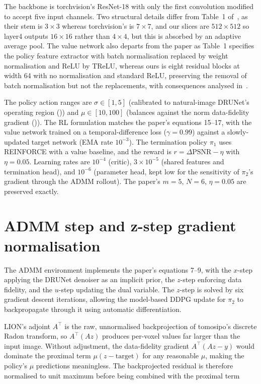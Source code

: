 The backbone is torchvision's ResNet-18 with only the first convolution modified to accept five input channels. Two structural details differ from Table~1 of~\citet{Wei2022TFPnP}, as their stem is $3\times3$ whereas torchvision's is $7\times7$, and our slices are $512\times512$ so layer4 outputs $16\times16$ rather than $4\times4$, but this is absorbed by an adaptive average pool. The value network also departs from the paper as Table~1 specifies the policy feature extractor with batch normalisation replaced by weight normalisation and ReLU by TReLU, whereas ours is eight residual blocks at width 64 with no normalisation and standard ReLU,  preserving the removal of batch normalisation but not the replacements, with consequences analysed in~.

The policy action ranges are $\sigma \in [1, 5]$ (calibrated to natural-image DRUNet's operating region ()) and $\mu \in [10, 100]$ (balances against the norm data-fidelity gradient ()). The RL formulation matches the paper's equations 15--17, with the value network trained on a temporal-difference loss ($\gamma = 0.99$) against a slowly-updated target network (EMA rate $10^{-3}$). The termination policy $\pi_1$ uses REINFORCE with a value baseline, and the reward is $r = \Delta\text{PSNR} - \eta$ with $\eta = 0.05$. Learning rates are $10^{-4}$ (critic), $3\times10^{-5}$ (shared features and termination head), and $10^{-6}$ (parameter head, kept low for the sensitivity of $\pi_2$'s gradient through the ADMM rollout). The paper's $m = 5$, $N = 6$, $\eta = 0.05$ are preserved exactly.

\section{ADMM step and z-step gradient normalisation}
\label{sec:admm-gradient}

The ADMM environment implements the paper's equations 7--9, with the $x$-step applying the DRUNet denoiser as an implicit prior, the $z$-step enforcing data fidelity, and the $u$-step updating the dual variable. The $z$-step is solved by six gradient descent iterations, allowing the model-based DDPG update for $\pi_2$ to backpropagate through it using automatic differentiation.

LION's adjoint $A^{\top}$ is the raw, unnormalised backprojection of tomosipo's discrete Radon transform, so $A^{\top}(Az)$ produces per-voxel values far larger than the input image. Without adjustment, the data-fidelity gradient $A^{\top}(Az - y)$ would dominate the proximal term $\mu(z - \text{target})$ for any reasonable $\mu$, making the policy's $\mu$ predictions meaningless. The backprojected residual is therefore normalised to unit maximum before being combined with the proximal term

